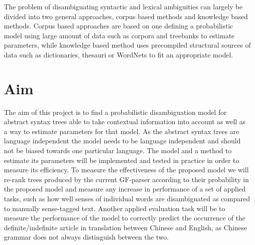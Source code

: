 The problem of disambiguating syntactic and lexical ambiguities can largely be divided into two general approaches, corpus based methods and knowledge based methods. Corpus based approaches are based on one defining a probabilistic model using large amount of data such as corpora and treebanks to estimate parameters, while knowledge based method uses precompiled structural sources of data such as dictionaries, thesauri or WordNets to fit an appropriate model. 



\section{Aim}
The aim of this project is to find a probabilistic disambiguation model for abstract syntax trees able to take contextual information into account as well as a way to estimate parameters for that model. As the abstract syntax trees are language independent the model needs to be language independent and should not be biased towards one particular language. The model and a method to estimate its parameters will be implemented and tested in practice in order to measure its efficiency. To measure the effectiveness of the proposed model we will re-rank trees produced by the current GF-parser according to their probability in the proposed model and measure any increase in performance of a set of applied tasks, such as how well senses of individual words are disambiguated as compared to manually sense-tagged text. Another applied evaluation task will be to measure the performance of the model to correctly predict the occurrence of the definite/indefinite article in translation between Chinese and English, as Chinese grammar does not always distinguish between the two.


